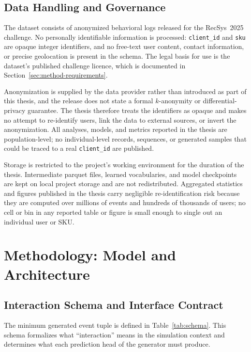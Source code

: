 \documentclass[sigconf,nonacm]{acmart}
\begin{document}
\subsection{Data Handling and Governance}
The dataset consists of anonymized behavioral logs released for the
RecSys~2025 challenge. No personally identifiable information is processed:
\texttt{client\_id} and \texttt{sku} are opaque integer identifiers, and no
free-text user content, contact information, or precise geolocation is present
in the schema. The legal basis for use is the dataset's published challenge
licence, which is documented in Section~\ref{sec:method-requirements}.

Anonymization is supplied by the data provider rather than introduced as part
of this thesis, and the release does not state a formal $k$-anonymity or
differential-privacy guarantee. The thesis therefore treats the identifiers as
opaque and makes no attempt to re-identify users, link the data to external
sources, or invert the anonymization. All analyses, models, and metrics
reported in the thesis are population-level; no individual-level records,
sequences, or generated samples that could be traced to a real
\texttt{client\_id} are published.

Storage is restricted to the project's working environment for the duration of
the thesis. Intermediate parquet files, learned vocabularies, and model
checkpoints are kept on local project storage and are not redistributed.
Aggregated statistics and figures published in the thesis carry negligible
re-identification risk because they are computed over millions of events and
hundreds of thousands of users; no cell or bin in any reported table or figure
is small enough to single out an individual user or SKU.


\section{Methodology: Model and Architecture}
\label{sec:method-model}

\subsection{Interaction Schema and Interface Contract}
The minimum generated event tuple is defined in Table~\ref{tab:schema}.
This schema formalizes what ``interaction'' means in the simulation context
and determines what each prediction head of the generator must produce.
\end{document}
